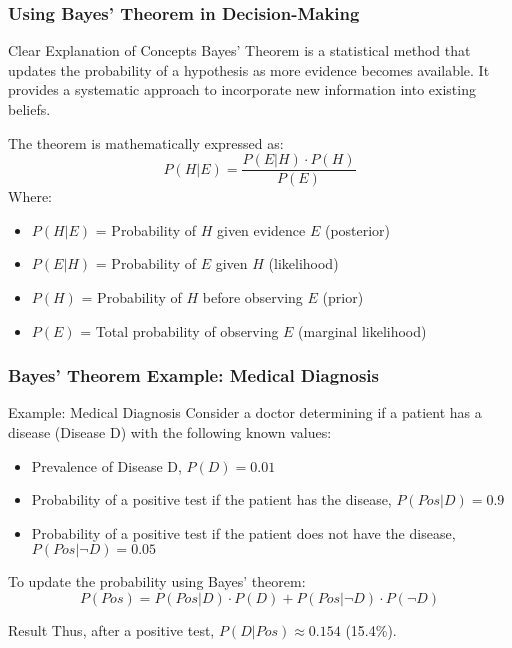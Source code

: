\documentclass[aspectratio=169]{beamer}
\begin{document}
\begin{frame}[fragile]
    \frametitle{Using Bayes' Theorem in Decision-Making}
    \begin{block}{Clear Explanation of Concepts}
        Bayes' Theorem is a statistical method that updates the probability of a hypothesis as more evidence becomes available. It provides a systematic approach to incorporate new information into existing beliefs.
    \end{block}
    The theorem is mathematically expressed as:
    \begin{equation}
    P(H | E) = \frac{P(E | H) \cdot P(H)}{P(E)}
    \end{equation}
    Where:
    \begin{itemize}
        \item \(P(H | E)\) = Probability of \(H\) given evidence \(E\) (posterior)
        \item \(P(E | H)\) = Probability of \(E\) given \(H\) (likelihood)
        \item \(P(H)\) = Probability of \(H\) before observing \(E\) (prior)
        \item \(P(E)\) = Total probability of observing \(E\) (marginal likelihood)
    \end{itemize}
\end{frame}

\begin{frame}[fragile]
    \frametitle{Bayes' Theorem Example: Medical Diagnosis}
    \begin{block}{Example: Medical Diagnosis}
        Consider a doctor determining if a patient has a disease (Disease D) with the following known values:
    \end{block}
    \begin{itemize}
        \item Prevalence of Disease D, \(P(D) = 0.01\)
        \item Probability of a positive test if the patient has the disease, \(P(Pos | D) = 0.9\)
        \item Probability of a positive test if the patient does not have the disease, \(P(Pos | \neg D) = 0.05\)
    \end{itemize}
    To update the probability using Bayes' theorem:
    \begin{equation}
    P(Pos) = P(Pos | D) \cdot P(D) + P(Pos | \neg D) \cdot P(\neg D)
    \end{equation}
    \begin{block}{Result}
        Thus, after a positive test, \(P(D | Pos) \approx 0.154\) (15.4\%).
    \end{block}
\end{frame}
\end{document}
